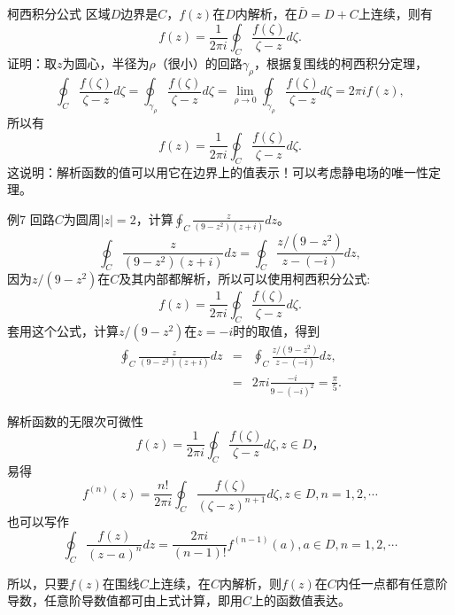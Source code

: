 \documentclass[11pt]{beamer}
\begin{document}
\begin{frame}{柯西积分公式}
区域$D$边界是$C$，$f(z)$在$D$内解析，在$\bar{D}=D+C$上连续，则有
\begin{equation}
f(z) = \frac{1}{2\pi i} \oint_C \frac{f(\zeta)}{\zeta - z} d\zeta.
\end{equation}
证明：取$z$为圆心，半径为$\rho$（很小）的回路$\gamma_\rho$，根据复围线的柯西积分定理，
\begin{equation}
\oint_C \frac{f(\zeta)}{\zeta - z} d \zeta
= \oint_{\gamma_\rho} \frac{f(\zeta)}{\zeta - z} d \zeta
= \lim\limits_{\rho \rightarrow 0} \oint_{\gamma_\rho} \frac{f(\zeta)}{\zeta - z} d \zeta = 2\pi i f(z),
\end{equation}
所以有
\begin{equation}
f(z) = \frac{1}{2\pi i} \oint_C \frac{f(\zeta)}{\zeta - z} d\zeta.
\end{equation}
这说明：解析函数的值可以用它在边界上的值表示！可以考虑静电场的唯一性定理。
\end{frame}

\begin{frame}{例7}
回路$C$为圆周$|z|=2$，计算$\oint_C \frac{z}{(9-z^2)(z+i)} dz$。
\begin{equation}
\oint_C \frac{z}{(9-z^2)(z+i)} dz
= \oint_C \frac{z/(9-z^2)}{z-(-i)} dz,
\end{equation}
因为$z/(9-z^2)$在$C$及其内部都解析，所以可以使用柯西积分公式:
\begin{equation}
f(z) = \frac{1}{2\pi i} \oint_C \frac{f(\zeta)}{\zeta - z} d\zeta.
\end{equation}
套用这个公式，计算$z/(9-z^2)$在$z=-i$时的取值，得到
\begin{eqnarray}
\oint_C \frac{z}{(9-z^2)(z+i)} dz
&=& \oint_C \frac{z/(9-z^2)}{z-(-i)} dz,
\nonumber\\
&=& 2\pi i \frac{-i}{9-(-i)^2} = \frac{\pi}{5}.
\end{eqnarray}
\end{frame}

\begin{frame}{解析函数的无限次可微性}
\begin{equation}
f(z) = \frac{1}{2\pi i} \oint_C \frac{f(\zeta)}{\zeta - z} d \zeta, z \in D，
\end{equation}
易得
\begin{equation}
f^{(n)}(z) = \frac{n!}{2\pi i} \oint_C \frac{f(\zeta)}{(\zeta - z)^{n+1}} d\zeta, z \in D, n=1,2,\cdots
\end{equation}
也可以写作
\begin{equation}
\oint_C \frac{f(z)}{(z-a)^n} dz
= \frac{2\pi i}{(n-1)!} f^{(n-1)} (a), a\in D, n=1,2,\cdots
\end{equation}

所以，只要$f(z)$在围线$C$上连续，在$C$内解析，则$f(z)$在$C$内任一点都有任意阶导数，任意阶导数值都可由上式计算，即用$C$上的函数值表达。

\end{frame}
\end{document}
